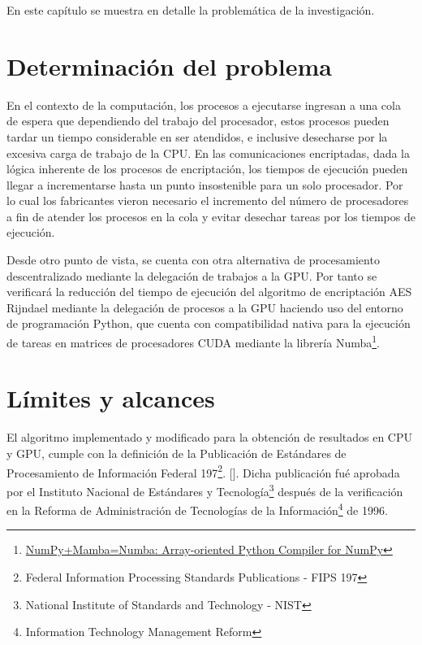 \documentclass[../main/main.tex]{subfiles}
\begin{document}
\espacio

  En este capítulo se muestra en detalle la problemática de la investigación.

  \section{Determinación del problema}

  En el contexto de la computación, los procesos a ejecutarse ingresan a una cola de espera que dependiendo del trabajo del procesador, estos procesos pueden tardar un tiempo considerable en ser atendidos, e inclusive desecharse por la excesiva carga de trabajo de la CPU. En las comunicaciones encriptadas, dada la lógica inherente de los procesos de encriptación, los tiempos de ejecución pueden llegar a incrementarse hasta un punto insostenible para un solo procesador. Por lo cual los fabricantes vieron necesario el incremento del número de procesadores a fin de atender los procesos en la cola y evitar desechar tareas por los tiempos de ejecución.

  Desde otro punto de vista, se cuenta con otra alternativa de procesamiento descentralizado mediante la delegación de trabajos a la GPU. Por tanto se verificará la reducción del tiempo de ejecución del algoritmo de encriptación AES Rijndael mediante la delegación de procesos a la GPU haciendo uso del entorno de programación Python, que cuenta con compatibilidad nativa para la ejecución de tareas en matrices de procesadores CUDA mediante la librería Numba\footnote{\href{http://numba.pydata.org/numba-doc/latest/cuda/index.html}{NumPy+Mamba=Numba: Array-oriented Python Compiler for NumPy}}.

  \section{Límites y alcances} \label{limites_alcances}

  El algoritmo implementado y modificado para la obtención de resultados en CPU y GPU, cumple con la definición de la Publicación de Estándares de Procesamiento de Información Federal 197\footnote{Federal Information Processing Standards Publications - FIPS 197}. [\cite{report:FIPS_197}]. Dicha publicación fué aprobada por el Instituto Nacional de Estándares y Tecnología\footnote{National Institute of Standards and Technology - NIST} después de la verificación en la Reforma de Administración de Tecnologías de la Información\footnote{Information Technology Management Reform} de 1996.
\end{document}
